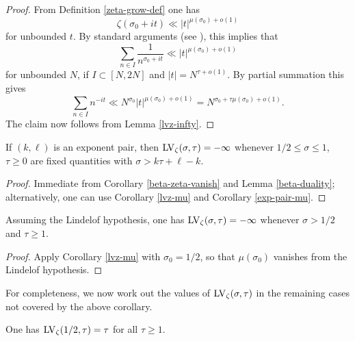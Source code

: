\begin{proof} From Definition \ref{zeta-grow-def} one has
    $$ \zeta(\sigma_0 + it) \ll |t|^{\mu(\sigma_0) + o(1)}$$
    for unbounded $t$.  By standard arguments (see \cite[(8.13)]{ivic}), this implies that
    $$ \sum_{n \in I} \frac{1}{n^{\sigma_0+it}} \ll |t|^{\mu(\sigma_0) + o(1)}$$
    for unbounded $N$, if $I \subset [N,2N]$ and $|t| = N^{\tau+o(1)}$.  By partial summation this gives
    $$ \sum_{n \in I} n^{-it} \ll N^{\sigma_0} |t|^{\mu(\sigma_0) + o(1)} = N^{\sigma_0 + \tau \mu(\sigma_0) + o(1)}.$$
    The claim now follows from Lemma \ref{lvz-infty}.
\end{proof}

\begin{corollary}\label{lvz-exp} If $(k,\ell)$ is an exponent pair, then $\mathrm{LV}_\zeta(\sigma,\tau) = -\infty$ whenever $1/2 \leq \sigma \leq 1$, $\tau \geq 0$ are fixed quantities with $\sigma > k \tau + \ell - k$.
\end{corollary}

\begin{proof} Immediate from Corollary \ref{beta-zeta-vanish} and Lemma \ref{beta-duality}; alternatively, one can use Corollary \ref{lvz-mu} and Corollary \ref{exp-pair-mu}.
\end{proof}


\begin{corollary}\label{lh-vanish} Assuming the Lindelof hypothesis, one has $\mathrm{LV}_\zeta(\sigma,\tau) = -\infty$ whenever $\sigma > 1/2$ and $\tau \geq 1$.
\end{corollary}

\begin{proof} Apply Corollary \ref{lvz-mu} with $\sigma_0=1/2$, so that $\mu(\sigma_0)$ vanishes from the Lindelof hypothesis.
\end{proof}

For completeness, we now work out the values of $\mathrm{LV}_\zeta(\sigma,\tau)$ in the remaining cases not covered by the above corollary.

\begin{lemma}[Value at $\sigma=1/2$]\label{lvz-2} One has $\mathrm{LV}_\zeta(1/2,\tau) = \tau$ for all $\tau \geq 1$.
\end{lemma}

